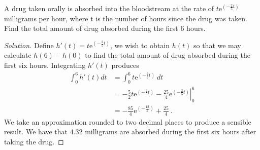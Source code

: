 \documentclass[compacto,10pt,comentarios]{aleph-notas}
\begin{document}
\begin{ejer}
    A drug taken orally is absorbed into the bloodstream at the rate of $t\mathrm{e}^{(-\frac{2}{5}t)}$ milligrams per hour,
    where t is the number of hours since the drug was taken. Find the total amount of drug
    absorbed during the first 6 hours.
\end{ejer}
\begin{proof}[Solution]
    Define $h'(t) = t\mathrm{e}^{(-\frac{2}{5}t)}$, we wish to obtain $h(t)$ so that we may calculate $h(6) - h(0)$ to find the total amount of drug absorbed during the first six hours. Integrating $h'(t)$ produces
    \begin{align*}
        \int_{0}^{6} h'(t) dt & = \int_{0}^{6} t\mathrm{e}^{(-\frac{2}{5}t)} ~ dt \\
        & = \left. -\frac{5}{2}t\mathrm{e}^{(-\frac{2}{5}t)} - \frac{25}{4} \mathrm{e}^{(-\frac{2}{5}t)} \right\rvert_{0}^{6} \\
        & = -\frac{85}{4}\mathrm{e}^{(-\frac{12}{5})} + \frac{25}{4} ~ .
    \end{align*}
    We take an approximation rounded to two decimal places to produce a sensible result. We have that $4.32$ milligrams are absorbed during the first six hours after taking the drug.
\end{proof}
\end{document}
